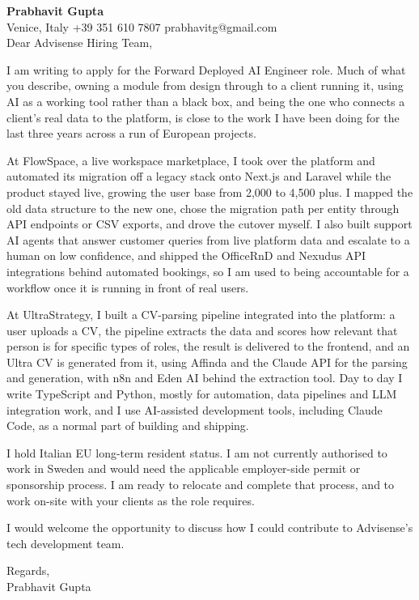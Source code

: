\documentclass[a4paper,10.5pt]{article}
\begin{document}
\textbf{Prabhavit Gupta}\\
Venice, Italy \textbar{} +39 351 610 7807 \textbar{} prabhavitg@gmail.com\\[10pt]
Dear Advisense Hiring Team,

I am writing to apply for the Forward Deployed AI Engineer role. Much of what you describe, owning a module from design through to a client running it, using AI as a working tool rather than a black box, and being the one who connects a client's real data to the platform, is close to the work I have been doing for the last three years across a run of European projects.

At FlowSpace, a live workspace marketplace, I took over the platform and automated its migration off a legacy stack onto Next.js and Laravel while the product stayed live, growing the user base from 2,000 to 4,500 plus. I mapped the old data structure to the new one, chose the migration path per entity through API endpoints or CSV exports, and drove the cutover myself. I also built support AI agents that answer customer queries from live platform data and escalate to a human on low confidence, and shipped the OfficeRnD and Nexudus API integrations behind automated bookings, so I am used to being accountable for a workflow once it is running in front of real users.

At UltraStrategy, I built a CV-parsing pipeline integrated into the platform: a user uploads a CV, the pipeline extracts the data and scores how relevant that person is for specific types of roles, the result is delivered to the frontend, and an Ultra CV is generated from it, using Affinda and the Claude API for the parsing and generation, with n8n and Eden AI behind the extraction tool. Day to day I write TypeScript and Python, mostly for automation, data pipelines and LLM integration work, and I use AI-assisted development tools, including Claude Code, as a normal part of building and shipping.

I hold Italian EU long-term resident status. I am not currently authorised to work in Sweden and would need the applicable employer-side permit or sponsorship process. I am ready to relocate and complete that process, and to work on-site with your clients as the role requires.

I would welcome the opportunity to discuss how I could contribute to Advisense's tech development team.

Regards,\\
Prabhavit Gupta
\end{document}
